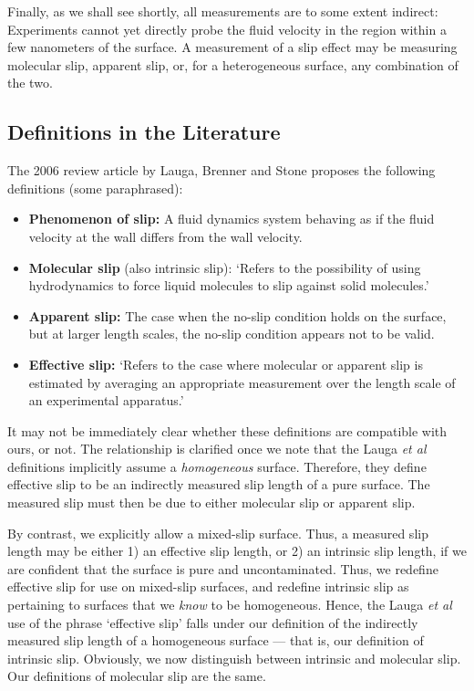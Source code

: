 \documentclass[12pt, a4paper, twoside, openright]{book}
\begin{document}
Finally, as we shall see shortly, all measurements are to some extent indirect: Experiments cannot yet directly probe the fluid velocity in the region within a few nanometers of the surface. A measurement of a slip effect may be measuring molecular slip, apparent slip, or, for a heterogeneous surface, any combination of the two.


\clearpage
\subsection*{Definitions in the Literature}

The 2006 review article by Lauga, Brenner and Stone \cite{LaugaReview2006} proposes the following definitions (some paraphrased):

\begin{itemize}

\item \textbf{Phenomenon of slip:} A fluid dynamics system behaving as if the fluid velocity at the wall differs from the wall velocity.

\item \textbf{Molecular slip} (also intrinsic slip): `Refers to the possibility of using hydrodynamics to force liquid molecules to slip against solid molecules.'

\item \textbf{Apparent slip:} The case when the no-slip condition holds on the surface, but at larger length scales, the no-slip condition appears not to be valid.

\item \textbf{Effective slip:} `Refers to the case where molecular or apparent slip is estimated by averaging an appropriate measurement over the length scale of an experimental apparatus.'

\end{itemize}

It may not be immediately clear whether these definitions are compatible with ours, or not. The relationship is clarified once we note that the Lauga \emph{et al} definitions implicitly assume a \emph{homogeneous} surface. Therefore, they define effective slip to be an indirectly measured slip length of a pure surface. The measured slip must then be due to either molecular slip or apparent slip.

By contrast, we explicitly allow a mixed-slip surface. Thus, a measured slip length may be either 1) an effective slip length, or 2) an intrinsic slip length, if we are confident that the surface is pure and uncontaminated. Thus, we redefine effective slip for use on mixed-slip surfaces, and redefine intrinsic slip as pertaining to surfaces that we \emph{know} to be homogeneous.
Hence, the Lauga \emph{et al} use of the phrase `effective slip' falls under our definition of the indirectly measured slip length of a homogeneous surface --- that is, our definition of intrinsic slip. Obviously, we now distinguish between intrinsic and molecular slip. Our definitions of molecular slip are the same.
\end{document}
